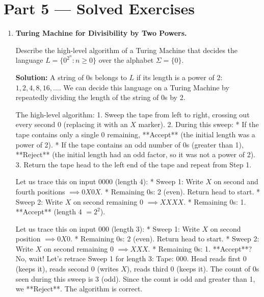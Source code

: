 \documentclass[12pt, a4paper]{book}
\begin{document}
\section{Part 5 --- Solved Exercises}

\begin{problembox}
\begin{enumerate}[label=\textbf{E\arabic*.}]
  \item \textbf{Turing Machine for Divisibility by Two Powers.}
  
        Describe the high-level algorithm of a Turing Machine that decides the language $L = \{0^{2^n} : n \ge 0\}$ over the alphabet $\Sigma = \{0\}$.
        
        \textbf{Solution:}
        A string of 0s belongs to $L$ if its length is a power of 2: $1, 2, 4, 8, 16, \dots$.
        We can decide this language on a Turing Machine by repeatedly dividing the length of the string of 0s by 2.
        
        The high-level algorithm:
        1. Sweep the tape from left to right, crossing out every second $0$ (replacing it with an $X$ marker).
        2. During this sweep:
           * If the tape contains only a single $0$ remaining, **Accept** (the initial length was a power of 2).
           * If the tape contains an odd number of $0$s (greater than 1), **Reject** (the initial length had an odd factor, so it was not a power of 2).
        3. Return the tape head to the left end of the tape and repeat from Step 1.
        
        Let us trace this on input $0000$ (length 4):
        * Sweep 1: Write $X$ on second and fourth positions $\implies 0 X 0 X$.
          * Remaining 0s: 2 (even). Return head to start.
        * Sweep 2: Write $X$ on second remaining $0$ $\implies X X X X$.
          * Remaining 0s: 1. **Accept** (length 4 $= 2^2$).
          
        Let us trace this on input $000$ (length 3):
        * Sweep 1: Write $X$ on second position $\implies 0 X 0$.
          * Remaining 0s: 2 (even). Return head to start.
        * Sweep 2: Write $X$ on second remaining $0$ $\implies X X X$.
          * Remaining 0s: 1. **Accept**? No, wait!
          Let's retrace Sweep 1 for length 3:
          Tape: $0 0 0$.
          Head reads first $0$ (keeps it), reads second $0$ (writes $X$), reads third $0$ (keeps it).
          The count of $0$s seen during this sweep is 3 (odd). Since the count is odd and greater than 1, we **Reject**.
          The algorithm is correct.
        

\end{enumerate}
\end{problembox}
\end{document}
